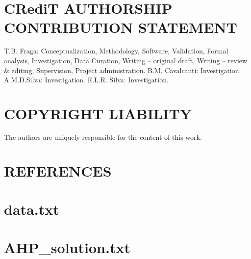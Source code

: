 \documentclass[10pt,fleqn,a4paper,twoside]{article}
\begin{document}
        \section{CRediT AUTHORSHIP CONTRIBUTION STATEMENT} 
		\label{sec:contributions}

		T.B. Fraga: Conceptualization, Methodology, Software, Validation, Formal analysis, Investigation, Data Curation, Writing – original draft, Writing – review \& editing, Supervision, Project administration. B.M. Cavalcanti: Investigation. A.M.D.Silva: Investigation. E.L.R. Silva: Investigation. 

    \section{COPYRIGHT LIABILITY}
    
        The authors are uniquely responsible for the content of this work.
        
    \section{REFERENCES}
    
        
        
        
        
        \newpage
        \begin{appendices}
		\setcounter{section}{0}
		\makeatletter
	\section{data.txt}

	
	
	\section{AHP\_solution.txt}

	

	\end{appendices}
\end{document}
